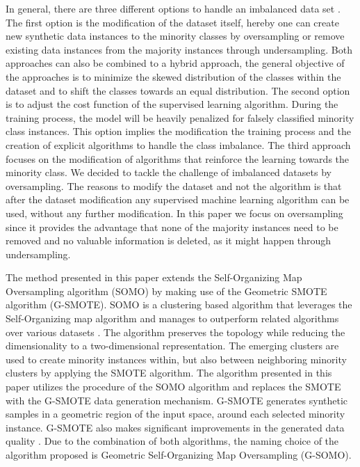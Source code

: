 \documentclass[parskip=full]{scrartcl}
\begin{document}
In general, there are three different options to handle an imbalanced data set
\cite{Fernandez2013}. The first option is the modification of the dataset
itself, hereby one can create new synthetic data instances to the minority
classes by oversampling or remove existing data instances from the majority
instances through undersampling. Both approaches can also be combined to a
hybrid approach, the general objective of the approaches is to minimize the
skewed distribution of the classes within the dataset and to shift the classes
towards an equal distribution. The second option is to adjust the cost function
of the supervised learning algorithm. During the training process, the model
will be heavily penalized for falsely classified minority class instances. This
option implies the modification the training process and the creation of
explicit algorithms to handle the class imbalance. The third approach focuses on
the modification of algorithms that reinforce the learning towards the minority
class. We decided to tackle the challenge of imbalanced datasets by
oversampling. The reasons to modify the dataset and not the algorithm is that
after the dataset modification any supervised machine learning algorithm can be
used, without any further modification. In this paper we focus on oversampling
since it provides the advantage that none of the majority instances need to be
removed and no valuable information is deleted, as it might happen through
undersampling.

The method presented in this paper extends the Self-Organizing Map Oversampling
algorithm (SOMO) by making use of the Geometric SMOTE algorithm (G-SMOTE). SOMO
is a clustering based algorithm that leverages the Self-Organizing map algorithm
and manages to outperform related algorithms over various datasets
\cite{Douzas2017B}. The algorithm preserves the topology while reducing the
dimensionality to a two-dimensional representation. The emerging clusters are
used to create minority instances within, but also between neighboring minority
clusters by applying the SMOTE algorithm. The algorithm presented in this paper
utilizes the procedure of the SOMO algorithm and replaces the SMOTE with the
G-SMOTE data generation mechanism. G-SMOTE generates synthetic samples in a
geometric region of the input space, around each selected minority instance.
G-SMOTE also makes significant improvements in the generated data quality
\cite{Douzas2017}. Due to the combination of both algorithms, the naming choice
of the algorithm proposed is Geometric Self-Organizing Map Oversampling
(G-SOMO).
\end{document}
